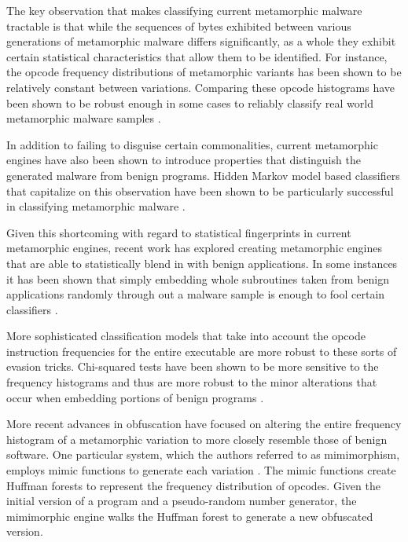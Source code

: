     The key observation that makes classifying current metamorphic malware
    tractable is that while the sequences of bytes exhibited between various
    generations of metamorphic malware differs significantly, as a whole they
    exhibit certain statistical characteristics that allow them to be
    identified. For instance, the opcode frequency distributions of metamorphic
    variants has been shown to be relatively constant between variations.
    Comparing these opcode histograms have been shown to be robust enough in
    some cases to reliably classify real world metamorphic malware samples
    \cite{histogram}.

    In addition to failing to disguise certain commonalities, current
    metamorphic engines have also been shown to introduce properties that
    distinguish the generated malware from benign programs.
    Hidden Markov model based classifiers that capitalize on this observation
    have been shown to be particularly successful in classifying metamorphic
    malware \cite{hmm_detect}.

    Given this shortcoming with regard to statistical fingerprints in current
    metamorphic engines, recent work has explored creating metamorphic engines
    that are able to statistically blend in with benign applications. In some
    instances it has been shown that simply embedding whole subroutines taken
    from benign applications randomly through out a malware sample is enough to
    fool certain classifiers \cite{hmm_evade}.

    More sophisticated classification models that take into account the opcode
    instruction frequencies for the entire executable are more robust to these
    sorts of evasion tricks. Chi-squared tests have been shown to be more
    sensitive to the frequency histograms and thus are more robust to the minor
    alterations that occur when embedding portions of benign programs
    \cite{chisquared}.

    More recent advances in obfuscation have focused on altering the entire
    frequency histogram of a metamorphic variation to more closely resemble
    those of benign software. One particular system, which the authors referred
    to as mimimorphism, employs mimic functions to generate each variation
    \cite{mimimorph}. The mimic functions create Huffman forests to represent
    the frequency distribution of opcodes. Given the initial version of a
    program and a pseudo-random number generator, the mimimorphic engine walks
    the Huffman forest to generate a new obfuscated version.

